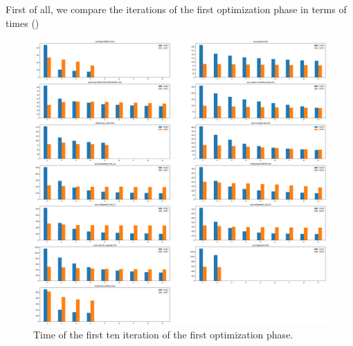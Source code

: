 First of all, we compare the iterations of the first optimization phase in terms of times ()
\begin{figure}[h]
	\centering
	\includegraphics[width=1\linewidth]{0-resources/hash-vs-sort}
	\caption{Time of the first ten iteration of the first optimization phase.}
	\label{fig:hash-vs-sort}
\end{figure}




